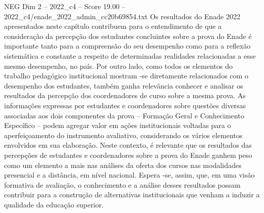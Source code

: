 \begin{textsample}{NEG Dim 2 – 2022\_c4 – Score 19.00 – 2022\_c4/enade\_2022\_admin\_cc20b69854.txt}
Os resultados do Enade 2022 apresentados neste capítulo contribuem para o entendimento de que a consideração da percepção dos estudantes concluintes sobre a prova do Enade é importante tanto para a compreensão do seu desempenho como para a reflexão sistemática e constante a respeito de determinadas realidades relacionadas a esse mesmo desempenho, no país.
Por outro lado, como todos os elementos do trabalho pedagógico institucional mostram -se diretamente relacionados com o desempenho dos estudantes, também ganha relevância conhecer e analisar os resultados da percepção dos coordenadores de curso sobre a mesma prova.
As informações expressas por estudantes e coordenadores sobre questões diversas associadas aos dois componentes da prova – Formação Geral e Conhecimento Específico – podem agregar valor em ações institucionais voltadas para o aperfeiçoamento do instrumento avaliativo, considerando os vários elementos envolvidos em sua elaboração.
Neste contexto, é relevante que os resultados das percepções de estudantes e coordenadores sobre a prova do Enade ganhem peso como um elemento a mais nas análises da oferta dos cursos nas modalidades presencial e a distância, em nível nacional.
Espera -se, assim, que, em uma visão formativa de avaliação, o conhecimento e a análise desses resultados possam contribuir para a construção de alternativas institucionais que venham a induzir a qualidade da educação superior.

\end{textsample}

